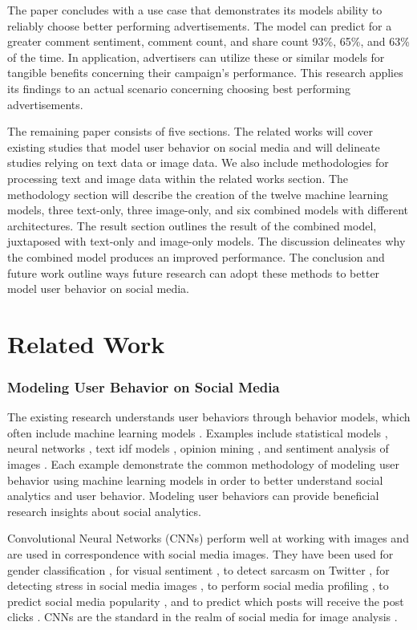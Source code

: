 \documentclass[mksc,blindrev]{informs3} %
\begin{document}
The paper concludes with a use case that demonstrates its models ability to reliably choose better performing advertisements. The model can predict for a greater comment sentiment, comment count, and share count 93\%, 65\%, and 63\% of the time. In application, advertisers can utilize these or similar models for tangible benefits concerning their campaign's performance. This research applies its findings to an actual scenario concerning choosing best performing advertisements.

The remaining paper consists of five sections. The related works will cover existing studies that model user behavior on social media and will delineate studies relying on text data or image data. We also include methodologies for processing text and image data within the related works section. The methodology section will describe the creation of the twelve machine learning models, three text-only, three image-only, and six combined models with different architectures. The result section outlines the result of the combined model, juxtaposed with text-only and image-only models. The discussion delineates why the combined model produces an improved performance. The conclusion and future work outline ways future research can adopt these methods to better model user behavior on social media.

\section{Related Work}

\subsubsection{Modeling User Behavior on Social Media}

The existing research understands user behaviors through behavior models, which often include machine learning models \cite{Li2015, 8029313, Ohsawa2013, Liu2012, Li2015}.  Examples include statistical models \cite{Li2015}, neural networks \cite{8029313}, text idf models \cite{Ohsawa2013}, opinion mining \cite{Liu2012}, and sentiment analysis of images \cite{Wang2015}. Each  example demonstrate the common methodology of modeling user behavior using machine learning models in order to better understand social analytics and user behavior. Modeling user behaviors can provide beneficial research insights about social analytics.

Convolutional Neural Networks (CNNs) perform well at working with images and are used in correspondence with social media images. They have been used for gender classification \cite{Hassner2015}, for visual sentiment \cite{Segalin2017, Xu2014}, to detect sarcasm on Twitter \cite{Poria2016}, for detecting stress in social media images \cite{Lin2014}, to perform social media profiling \cite{Segalin2017}, to predict social media popularity \cite{Gelli2015}, and to predict which posts will receive the post clicks \cite{Khosla2014}. CNNs are the standard in the realm of social media for image analysis \cite{Hassner2015}. 
\end{document}
